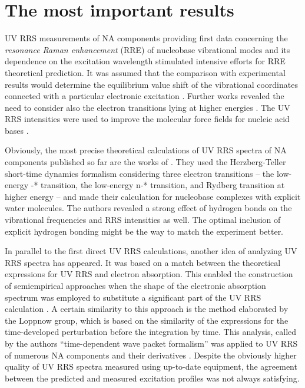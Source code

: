 \section{The most important results}

UV RRS measurements of NA components providing first data concerning the
\emph{resonance Raman enhancement} (RRE) of nucleobase vibrational modes and
its dependence on the excitation wavelength stimulated intensive efforts for
RRE theoretical prediction.
It was assumed that the comparison with experimental results would determine
the equilibrium value shift of the vibrational coordinates
connected with a particular electronic excitation
\textcite{Peticolas1970}.
Further works revealed the need to consider also the electron transitions lying
at higher energies
\parencite{Chinsky1980}.
The UV RRS intensities were used to improve the molecular force fields for
nucleic acid bases
\parencite{Lagant1991}.

Obviously, the most precise theoretical calculations of UV RRS spectra of NA
components published so far are the works of
\textcite{%
	Sun2014,%
	Sun2015,%
	Sun2017%
}.
They used the Herzberg-Teller short-time dynamics formalism considering three
electron transitions --
	the low-energy -* transition,
	the low-energy n-* transition,
	and Rydberg transition at higher energy
-- and made their calculation for nucleobase complexes with explicit water
molecules.
The authors revealed a strong effect of hydrogen bonds on the vibrational
frequencies and RRS intensities as well.
The optimal inclusion of explicit hydrogen bonding might be the way to match
the experiment better.

In parallel to the first direct UV RRS calculations, another idea of analyzing
UV RRS spectra has appeared.
It was based on a match between the theoretical expressions for UV RRS and
electron absorption.
This enabled the construction of semiempirical approaches when the shape of the
electronic absorption spectrum was employed to substitute a significant part of
the UV RRS calculation
\parencite{Blazej1980}.
A certain similarity to this approach is the method elaborated by the Loppnow
group, which is based on the similarity of the expressions for the
time-developed perturbation before the integration by time.
This analysis, called by the authors “time-dependent wave packet formalism” was
applied to UV RRS of numerous NA components and their derivatives
\parencite{Billinghurst2006a}.
Despite the obviously higher quality of UV RRS spectra measured using
up-to-date equipment, the agreement between the predicted and measured
excitation profiles was not always satisfying.

